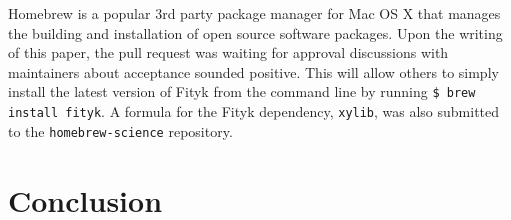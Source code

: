 \documentclass[12pt,a4paper]{article}
\begin{document}
Homebrew\cite{home} is a popular 3rd party package manager for Mac OS X that manages the building and installation of open source software packages.  Upon the writing of this paper, the pull request was waiting for approval discussions with maintainers about acceptance sounded positive\cite{fpr}.  This will allow others to simply install the latest version of Fityk from the command line by running \texttt{\$ brew install fityk}.  A formula for the Fityk dependency, \texttt{xylib}, was also submitted to the \texttt{homebrew-science} repository\cite{xpr}.


\section{Conclusion} %

\lipsum[6] %

\lipsum[6] %

\lipsum[6] %

 
 \nocite{*}
\end{document}
